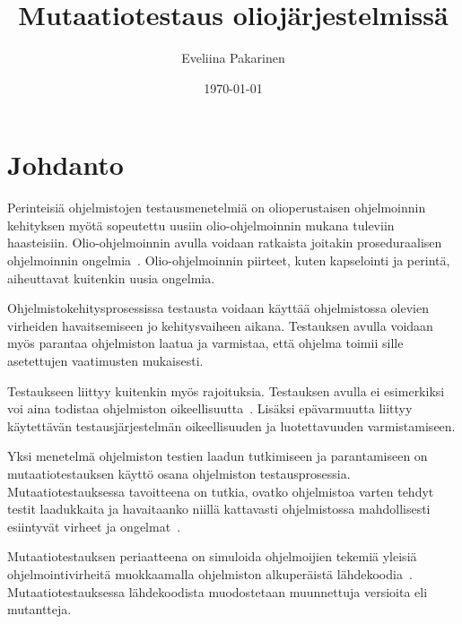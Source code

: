 \documentclass[finnish, grading]{tktltiki2}
\title{Mutaatiotestaus oliojärjestelmissä}
\author{Eveliina Pakarinen}
\date{\today}
\theoremstyle{definition}
\theoremstyle{remark}
\begin{document}

\frontmatter      %

\maketitle        %
\makeabstract     %

\tableofcontents  %


\mainmatter       %




\section{Johdanto}

Perinteisiä ohjelmistojen testausmenetelmiä on olioperustaisen ohjelmoinnin kehityksen myötä sopeutettu uusiin olio-ohjelmoinnin mukana tuleviin haasteisiin. Olio-ohjelmoinnin avulla voidaan ratkaista joitakin proseduraalisen ohjelmoinnin ongelmia~\cite[s. 86]{Mariani:Pezze:2008}. Olio-ohjelmoinnin piirteet, kuten kapselointi ja perintä, aiheuttavat kuitenkin uusia ongelmia.

Ohjelmistokehitysprosessissa testausta voidaan käyttää ohjelmistossa olevien virheiden havaitsemiseen jo kehitysvaiheen aikana. Testauksen avulla voidaan myös parantaa ohjelmiston laatua ja varmistaa, että ohjelma toimii sille asetettujen vaatimusten mukaisesti. 

Testaukseen liittyy kuitenkin myös rajoituksia. Testauksen avulla ei esimerkiksi voi aina todistaa ohjelmiston oikeellisuutta~\cite[s. 58]{Binder:1999}. Lisäksi epävarmuutta liittyy käytettävän testausjärjestelmän oikeellisuuden ja luotettavuuden varmistamiseen.

Yksi menetelmä ohjelmiston testien laadun tutkimiseen ja parantamiseen on mutaatiotestauksen käyttö osana ohjelmiston testausprosessia. Mutaatiotestauksessa tavoitteena on tutkia, ovatko ohjelmistoa varten tehdyt testit laadukkaita ja havaitaanko niillä kattavasti ohjelmistossa mahdollisesti esiintyvät virheet ja ongelmat~\cite[s. 649]{Jia:Harman:2011}. 

Mutaatiotestauksen periaatteena on simuloida ohjelmoijien tekemiä yleisiä ohjelmointivirheitä muokkaamalla ohjelmiston alkuperäistä lähdekoodia~\cite[s. 649]{Jia:Harman:2011}. Mutaatiotestauksessa lähdekoodista muodostetaan muunnettuja versioita eli mutantteja. 
\end{document}
